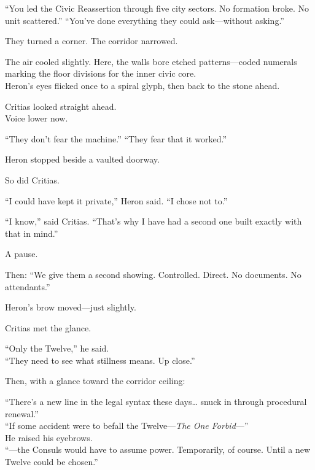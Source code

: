 \documentclass[9pt]{article}
\begin{document}
“You led the Civic Reassertion through five city sectors. No formation broke. No unit scattered.”  
“You’ve done everything they could ask—without asking.”

\vspace{1em}

They turned a corner. The corridor narrowed.

The air cooled slightly.  
Here, the walls bore etched patterns—coded numerals marking the floor divisions for the inner civic core.\\
Heron’s eyes flicked once to a spiral glyph, then back to the stone ahead.

Critias looked straight ahead.\\
Voice lower now.

“They don’t fear the machine.”  
“They fear that it worked.”

\vspace{1em}

Heron stopped beside a vaulted doorway.

So did Critias.

\vspace{1em}

“I could have kept it private,” Heron said.  
“I chose not to.”

“I know,” said Critias.  
“That’s why I have had a second one built exactly with that in mind.”

\vspace{1em}

A pause.

Then: “We give them a second showing. Controlled. Direct. No documents. No attendants.”

Heron’s brow moved—just slightly.

Critias met the glance.

\vspace{1em}

“Only the Twelve,” he said.\\
“They need to see what stillness means. Up close.”

\vspace{1em}

Then, with a glance toward the corridor ceiling:

“There’s a new line in the legal syntax these days… snuck in through procedural renewal.”\\
“If some accident were to befall the Twelve—\textit{The One Forbid}—” \\
He raised his eyebrows.\\
“—the Consuls would have to assume power. Temporarily, of course. Until a new Twelve could be chosen.”
\end{document}
